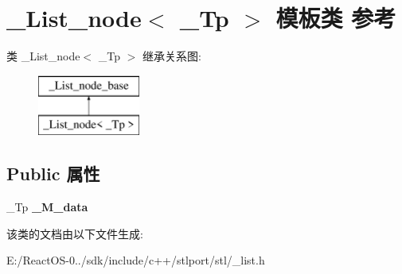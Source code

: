 \hypertarget{class___list__node}{}\section{\+\_\+\+List\+\_\+node$<$ \+\_\+\+Tp $>$ 模板类 参考}
\label{class___list__node}
类 \+\_\+\+List\+\_\+node$<$ \+\_\+\+Tp $>$ 继承关系图\+:\begin{figure}[H]
\begin{center}
\leavevmode
\includegraphics[height=2.000000cm]{class___list__node}
\end{center}
\end{figure}
\subsection*{Public 属性}
\begin{DoxyCompactItemize}
\item 
\mbox{\label{class___list__node_af75a2a58c811ade462dbc0e6f5d93917}} 
\+\_\+\+Tp {\bfseries \+\_\+\+M\+\_\+data}
\end{DoxyCompactItemize}


该类的文档由以下文件生成\+:\begin{DoxyCompactItemize}
\item 
E\+:/\+React\+O\+S-\/0../sdk/include/c++/stlport/stl/\+\_\+list.\+h\end{DoxyCompactItemize}
